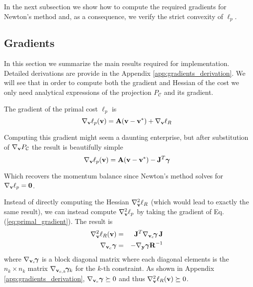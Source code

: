In the next subsection we show how to compute the required gradients for
Newton's method and, as a consequence, we verify the strict convexity of
$\ell_p$.


\subsection{Gradients}
\label{sec:gradients}

In this section we summarize the main results required for implementation.
Detailed derivations are provide in the Appendix \ref{app:gradients_derivation}.
We will see that in order to compute both the gradient and Hessian of the cost
we only need analytical expressions of the projection $P_\mathcal{C}$ and its
gradient.

The gradient of the primal cost $\ell_p$ is
\begin{equation}
	\nabla_{\mathbf{v}}\ell_p({\mathbf{v}}) = {\mathbf{A}}({\mathbf{v}}-{\mathbf{v}}^*) + \nabla_{\mathbf{v}}\ell_R
\end{equation}

Computing this gradient might seem a daunting enterprise, but after substitution
of $\nabla_{\mathbf{v}}P_\mathcal{C}$ the result is beautifully simple
\begin{equation}
	\nabla_\mf{v}\ell_p(\mf{v}) = \mf{A}(\mf{v}-\mf{v}^*) - \mf{J}^T\bgamma
	\label{eq:primal_gradient}
\end{equation}

Which recovers the momentum balance since Newton's method solves for
$\nabla_{\mathbf{v}}\ell_p={\mathbf{0}}$.

Instead of directly computing the Hessian $\nabla_{\mathbf{v}}^2\ell_R$ (which would
lead to exactly the same result), we can instead compute $\nabla_{\mathbf{v}}^2\ell_p$
by taking the gradient of Eq. (\ref{eq:primal_gradient}). The result is
\begin{eqnarray}
	\nabla_\mf{v}^2\ell_R(\mf{v}) &=&
	\mf{J}^T\nabla_{\mf{v}_c}\!\bgamma\,\mf{J}\nonumber\\
	\nabla_{\mf{v}_c}\bgamma &=& -\nabla_\mf{y}\bgamma \mf{R}^{-1}
	\label{eq:ellR_hessian}
\end{eqnarray}
where $\nabla_{{\mathbf{v}}_c}\!{\bm\gamma}$ is a block diagonal matrix where each
diagonal elements is the $n_k\times n_k$ matrix
$\nabla_{{\mathbf{v}}_{c,k}}\!{\bm\gamma}_k$ for the $k\text{-th}$ constraint. As shown in
Appendix \ref{app:gradients_derivation}, $\nabla_{{\mathbf{v}}_c}{\bm\gamma}\succeq 0$ and
thus $\nabla_{\mathbf{v}}^2\ell_R({\mathbf{v}})\succeq 0$.

